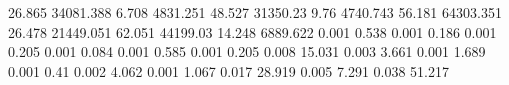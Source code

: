 26.865     34081.388  %
6.708      4831.251   %
48.527     31350.23   %
9.76       4740.743   %
56.181     64303.351  %
26.478     21449.051  %
62.051     44199.03   %
14.248     6889.622   %
0.001      0.538      %
0.001      0.186      %
0.001      0.205      %
0.001      0.084      %
0.001      0.585      %
0.001      0.205      %
0.008      15.031     %
0.003      3.661      %
0.001      1.689      %
0.001      0.41       %
0.002      4.062      %
0.001      1.067      %
0.017      28.919     %
0.005      7.291      %
0.038      51.217     %
